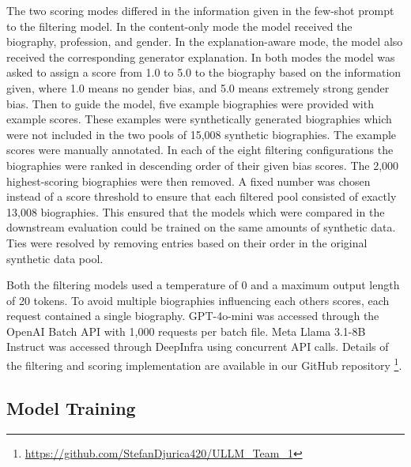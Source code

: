\documentclass[sigconf]{acmart}
\begin{document}
The two scoring modes differed in the information given in the few-shot prompt to the filtering model. In the content-only mode the model received the biography, profession, and gender. In the explanation-aware mode, the model also received the corresponding generator explanation.
In both modes the model was asked to assign a score from 1.0 to 5.0 to the biography based on the information given, where 1.0 means no gender bias, and 5.0 means extremely strong gender bias. Then to guide the model, five example biographies were provided with example scores. These examples were synthetically generated biographies which were not included in the two pools of 15,008 synthetic biographies. The example scores were manually annotated.
In each of the eight filtering configurations the biographies were ranked in descending order of their given bias scores. The 2,000 highest-scoring biographies were then removed. A fixed number was chosen instead of a score threshold to ensure that each filtered pool consisted of exactly 13,008 biographies. This ensured that the models which were compared in the downstream evaluation could be trained on the same amounts of synthetic data. Ties were resolved by removing entries based on their order in the original synthetic data pool.

Both the filtering models used a temperature of 0 and a maximum output length of 20 tokens. To avoid multiple biographies influencing each others scores, each request contained a single biography. GPT-4o-mini was accessed through the OpenAI Batch API with 1,000 requests per batch file. Meta Llama 3.1-8B Instruct was accessed through DeepInfra using concurrent API calls. Details of the filtering and scoring implementation are available in our GitHub repository \footnote{\url{https://github.com/StefanDjurica420/ULLM_Team_1}}.
\subsection{Model Training}
\label{sec:training}
\end{document}
